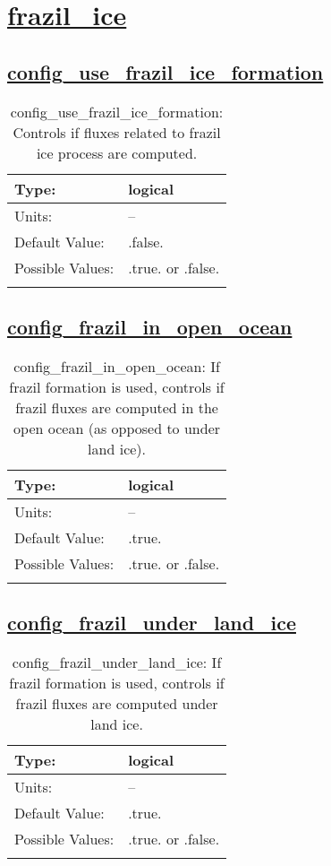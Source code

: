 \section[frazil\_ice]{\hyperref[sec:nm_tab_frazil_ice]{frazil\_ice}}
\label{sec:nm_sec_frazil_ice}
\subsection[config\_use\_frazil\_ice\_formation]{\hyperref[sec:nm_tab_frazil_ice]{config\_use\_frazil\_ice\_formation}}
\label{subsec:nm_sec_config_use_frazil_ice_formation}
\begin{center}
\begin{longtable}{| p{2.0in} || p{4.0in} |}
    \hline
    Type: & logical \\
    \hline
    Units: & -- \\
    \hline
    Default Value: & .false. \\
    \hline
    Possible Values: & .true. or .false. \\
    \hline
    \caption{config\_use\_frazil\_ice\_formation: Controls if fluxes related to frazil ice process are computed.}
\end{longtable}
\end{center}
\subsection[config\_frazil\_in\_open\_ocean]{\hyperref[sec:nm_tab_frazil_ice]{config\_frazil\_in\_open\_ocean}}
\label{subsec:nm_sec_config_frazil_in_open_ocean}
\begin{center}
\begin{longtable}{| p{2.0in} || p{4.0in} |}
    \hline
    Type: & logical \\
    \hline
    Units: & -- \\
    \hline
    Default Value: & .true. \\
    \hline
    Possible Values: & .true. or .false. \\
    \hline
    \caption{config\_frazil\_in\_open\_ocean: If frazil formation is used, controls if frazil fluxes are computed in the open ocean (as opposed to under land ice).}
\end{longtable}
\end{center}
\subsection[config\_frazil\_under\_land\_ice]{\hyperref[sec:nm_tab_frazil_ice]{config\_frazil\_under\_land\_ice}}
\label{subsec:nm_sec_config_frazil_under_land_ice}
\begin{center}
\begin{longtable}{| p{2.0in} || p{4.0in} |}
    \hline
    Type: & logical \\
    \hline
    Units: & -- \\
    \hline
    Default Value: & .true. \\
    \hline
    Possible Values: & .true. or .false. \\
    \hline
    \caption{config\_frazil\_under\_land\_ice: If frazil formation is used, controls if frazil fluxes are computed under land ice.}
\end{longtable}
\end{center}
